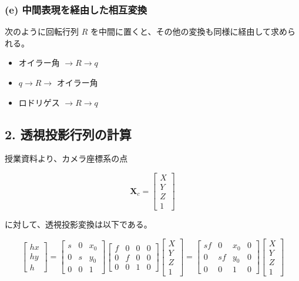 ﻿\documentclass[11pt,a4paper]{ltjsarticle}
\begin{document}
\subsubsection*{(e) 中間表現を経由した相互変換}
次のように回転行列 $R$ を中間に置くと、その他の変換も同様に経由して求められる。
\begin{itemize}
  \item オイラー角 $\rightarrow R \rightarrow q$
  \item $q \rightarrow R \rightarrow$ オイラー角
  \item ロドリゲス $\rightarrow R \rightarrow q$
\end{itemize}
\setlength{\leftskip}{0em}
\subsection*{2. 透視投影行列の計算}
授業資料より、カメラ座標系の点

\[
\mathbf{X}_c=
\begin{bmatrix}
X\\Y\\Z\\1
\end{bmatrix}
\]

に対して、透視投影変換は以下である。

\[
\begin{bmatrix}hx\\hy\\h\end{bmatrix}
=\begin{bmatrix}s&0&x_0\\0&s&y_0\\0&0&1\end{bmatrix}\begin{bmatrix}f&0&0&0\\0&f&0&0\\0&0&1&0\end{bmatrix}\begin{bmatrix}X\\Y\\Z\\1\end{bmatrix}
=\begin{bmatrix}sf&0&x_0&0\\0&sf&y_0&0\\0&0&1&0\end{bmatrix}\begin{bmatrix}X\\Y\\Z\\1\end{bmatrix}
\]
\end{document}
